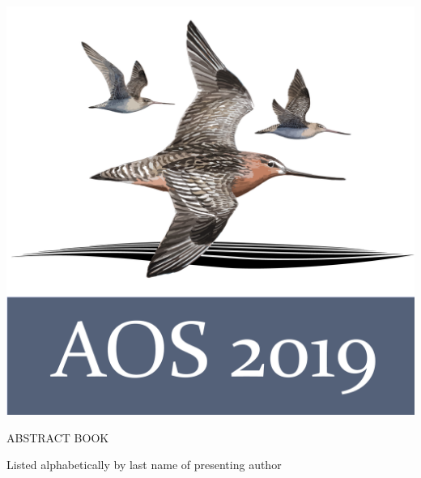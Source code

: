 \documentclass[twoside]{article}
\begin{document}

\thispagestyle{empty}
\pagestyle{fancy}

\setlength{\parindent}{0cm}

\newcommand\normaltalk[3]{%
	\textbf{#1}
	
	\vspace{12pt}
	
	#2

	\vspace{12pt}
	
        #3
	
	\begin{center}
        \noindent\rule{2cm}{0.4pt}	
        \end{center}
        
}


\vspace{20pt}
\begin{center}
    \includegraphics[width=\textwidth]{AOS2019Logo.png}
    
    \vspace{20pt}
    
    \huge{ABSTRACT BOOK}
   
    \vspace{20pt}
    
    \huge{Listed alphabetically by last name of presenting author}
    
    \tableofcontents

	
\end{center}
\end{document}
